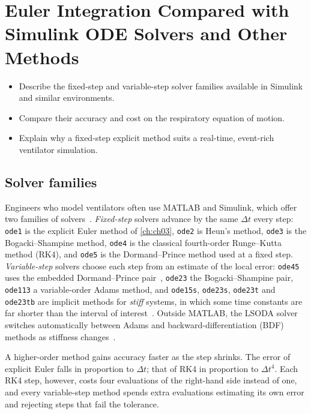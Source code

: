 \chapter{Euler Integration Compared with Simulink ODE Solvers and Other Methods}
\label{ch:ch04}

\begin{objectives}
\begin{itemize}[leftmargin=*]
  \item Describe the fixed-step and variable-step solver families available in Simulink and similar environments.
  \item Compare their accuracy and cost on the respiratory equation of motion.
  \item Explain why a fixed-step explicit method suits a real-time, event-rich ventilator simulation.
\end{itemize}
\end{objectives}

\section{Solver families}
\label{sec:solv-families}
Engineers who model ventilators often use MATLAB and Simulink, which offer two families of solvers~\citep{shampine1997,mathworks_solvers}. \emph{Fixed-step} solvers advance by the same $\Delta t$ every step: \texttt{ode1} is the explicit Euler method of \cref{ch:ch03}, \texttt{ode2} is Heun's method, \texttt{ode3} is the Bogacki--Shampine method, \texttt{ode4} is the classical fourth-order Runge--Kutta method (RK4), and \texttt{ode5} is the Dormand--Prince method used at a fixed step. \emph{Variable-step} solvers choose each step from an estimate of the local error: \texttt{ode45} uses the embedded Dormand--Prince pair~\citep{dormand1980}, \texttt{ode23} the Bogacki--Shampine pair, \texttt{ode113} a variable-order Adams method, and \texttt{ode15s}, \texttt{ode23s}, \texttt{ode23t} and \texttt{ode23tb} are implicit methods for \emph{stiff} systems, in which some time constants are far shorter than the interval of interest~\citep{hairer1996}. Outside MATLAB, the LSODA solver switches automatically between Adams and backward-differentiation (BDF) methods as stiffness changes~\citep{petzold1983}.

A higher-order method gains accuracy faster as the step shrinks. The error of explicit Euler falls in proportion to $\Delta t$; that of RK4 in proportion to $\Delta t^4$. Each RK4 step, however, costs four evaluations of the right-hand side instead of one, and every variable-step method spends extra evaluations estimating its own error and rejecting steps that fail the tolerance.

